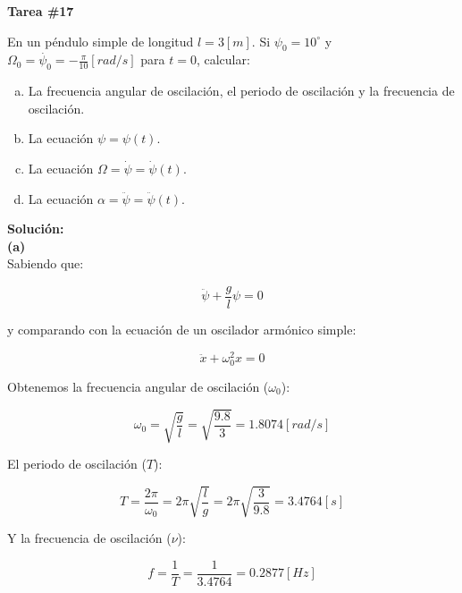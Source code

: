 \documentclass[letter,11pt]{article}
\begin{document}
\begin{center}
    {\Large \bf{Tarea \#17}}
\end{center}

En un péndulo simple de longitud $l = 3[m]$. Si $\psi_0 = 10^\circ$ y
$\Omega_0 = \dot{\psi_0} = -\frac{\pi}{10} [rad/s]$ para $t = 0$, calcular:

\begin{enumerate}[a)]
    \item La frecuencia angular de oscilación, el periodo de oscilación y la
        frecuencia de oscilación.
    \item La ecuación $\psi = \psi(t)$.
    \item La ecuación $\Omega = \dot{\psi} = \dot{\psi}(t)$.
    \item La ecuación $\alpha = \ddot{\psi} = \ddot{\psi}(t)$.
\end{enumerate}

\vspace{0.5cm}
\textbf{Solución:} \\

\textbf{(a)} \\

Sabiendo que:

\begin{equation}
    \ddot{\psi} + \frac{g}{l} \psi = 0
\end{equation}

y comparando con la ecuación de un oscilador armónico simple:

\begin{equation}
    \ddot{x} + \omega^2_0 x = 0
\end{equation}

Obtenemos la frecuencia angular de oscilación ($\omega_0$):

\begin{equation}
    \omega_0 = \sqrt{\frac{g}{l}}= \sqrt{\frac{9.8}{3}} = 1.8074 [rad/s]
\end{equation}

El periodo de oscilación ($T$):

\begin{equation}
    T = \frac{2 \pi}{\omega_0} = 2 \pi \sqrt{\frac{l}{g}} = 2 \pi \sqrt{\frac{3}{9.8}} = 3.4764 [s]
\end{equation}

Y la frecuencia de oscilación ($\nu$):

\begin{equation}
    f = \frac{1}{T} = \frac{1}{3.4764} = 0.2877 [Hz]
\end{equation}
\end{document}
